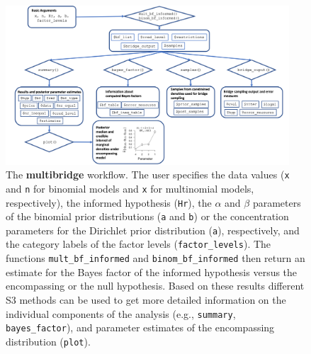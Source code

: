 \documentclass[
  english,
  man,floatsintext]{apa6}
\begin{document}
\begin{figure}
\includegraphics[width=400px]{scheme_multibridge} \caption{The \textbf{multibridge} workflow. The user specifies the data values (\texttt{x} and \texttt{n} for binomial models and \texttt{x} for multinomial models, respectively), the informed hypothesis (\texttt{Hr}), the \(\alpha\) and \(\beta\) parameters of the binomial prior distributions (\texttt{a} and \texttt{b}) or the concentration parameters for the Dirichlet prior distribution (\texttt{a}), respectively, and the category labels of the factor levels (\texttt{factor\_levels}). The functions \texttt{mult\_bf\_informed} and \texttt{binom\_bf\_informed} then return an estimate for the Bayes factor of the informed hypothesis versus the encompassing or the null hypothesis. Based on these results different S3 methods can be used to get more detailed information on the individual components of the analysis (e.g., \texttt{summary}, \texttt{bayes\_factor}), and parameter estimates of the encompassing distribution (\texttt{plot}).}\label{fig:scheme-multibridge}
\end{figure}
\clearpage
\end{document}

